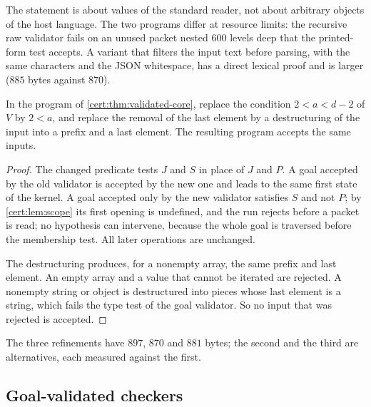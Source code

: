 The statement is about values of the standard reader, not about arbitrary
objects of the host language. The two programs differ at resource limits: the
recursive raw validator fails on an unused packet nested $600$ levels deep
that the printed-form test accepts. A variant that filters the input text
before parsing, with the same characters and the JSON whitespace, has a
direct lexical proof and is larger ($885$ bytes against $870$).

\begin{theorem}\label{cert:thm:scope-kernel}
In the program of \cref{cert:thm:validated-core}, replace the condition
$2<a<d-2$ of $V$ by $2<a$, and replace the removal of the last element by a
destructuring of the input into a prefix and a last element. The resulting
program accepts the same inputs.
\end{theorem}
\begin{proof}
The changed predicate tests $J$ and $S$ in place of $J$ and $P$. A goal
accepted by the old validator is accepted by the new one and leads to the
same first state of the kernel. A goal accepted only by the new validator
satisfies $S$ and not $P$; by \cref{cert:lem:scope} its first opening is
undefined, and the run rejects before a packet is read; no hypothesis can
intervene, because the whole goal is traversed before the membership test.
All later operations are unchanged.

The destructuring produces, for a nonempty array, the same prefix and last
element. An empty array and a value that cannot be iterated are rejected. A
nonempty string or object is destructured into pieces whose last element is a
string, which fails the type test of the goal validator. So no input that was
rejected is accepted.
\end{proof}

The three refinements have $897$, $870$ and $881$ bytes; the second and the
third are alternatives, each measured against the first.

\subsection{Goal-validated checkers}

